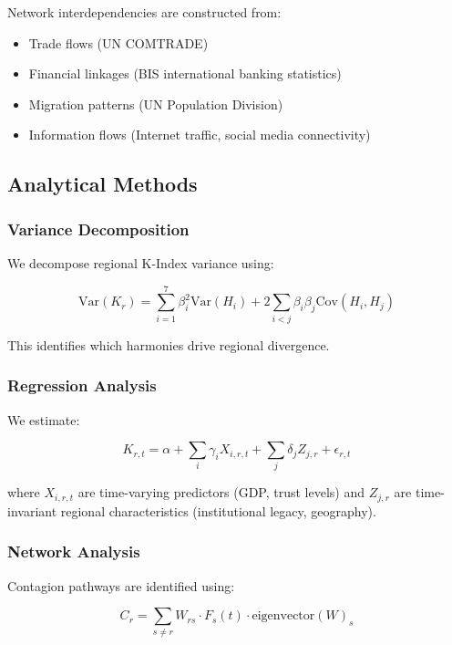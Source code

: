 \documentclass[12pt,a4paper]{article}
\begin{document}
Network interdependencies are constructed from:
\begin{itemize}
    \item Trade flows (UN COMTRADE)
    \item Financial linkages (BIS international banking statistics)
    \item Migration patterns (UN Population Division)
    \item Information flows (Internet traffic, social media connectivity)
\end{itemize}

\subsection{Analytical Methods}

\subsubsection{Variance Decomposition}

We decompose regional K-Index variance using:

\begin{equation}
\text{Var}(K_r) = \sum_{i=1}^{7} \beta_i^2 \text{Var}(H_i) + 2\sum_{i<j} \beta_i \beta_j \text{Cov}(H_i, H_j)
\end{equation}

This identifies which harmonies drive regional divergence.

\subsubsection{Regression Analysis}

We estimate:

\begin{equation}
K_{r,t} = \alpha + \sum_i \gamma_i X_{i,r,t} + \sum_j \delta_j Z_{j,r} + \epsilon_{r,t}
\end{equation}

where $X_{i,r,t}$ are time-varying predictors (GDP, trust levels) and $Z_{j,r}$ are time-invariant regional characteristics (institutional legacy, geography).

\subsubsection{Network Analysis}

Contagion pathways are identified using:

\begin{equation}
C_r = \sum_{s \neq r} W_{rs} \cdot F_s(t) \cdot \text{eigenvector}(W)_s
\end{equation}
\end{document}

